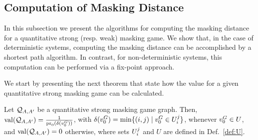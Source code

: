 \subsection{Computation of Masking Distance}

In this subsection we present the algorithms for computing the masking distance 
for a quantitative strong (resp. weak) masking game.
We show that, in the case of deterministic systems, computing the  
masking distance can be accomplished by a shortest path algorithm. 
In contrast, for non-deterministic systems, this computation can be performed 
via a fix-point approach.

We start by presenting the next theorem that state how the value for a 
given quantitative strong masking game can be calculated.
%
\begin{thm} \label{thm:quant_game}
  Let $\mathcal{Q}_{A, A'}$ be a quantitative strong masking game graph.
  \sloppy Then, $\operatorname{val}(\mathcal{Q}_{A, A'}) = \frac{1}{\operatorname{pr}_{0}(\delta(v_0^G))}$, with
  $\delta(v_0^G) = \min \{ (i,j) \mid  v_0^G \in U^j_i \}$, whenever
  $v_0^G \in U$, and $\operatorname{val}(\mathcal{Q}_{A, A'})=0$ otherwise, where
  sets $U^j_i$ and $U$ are defined in Def.~\ref{def:U}.

\end{thm}
